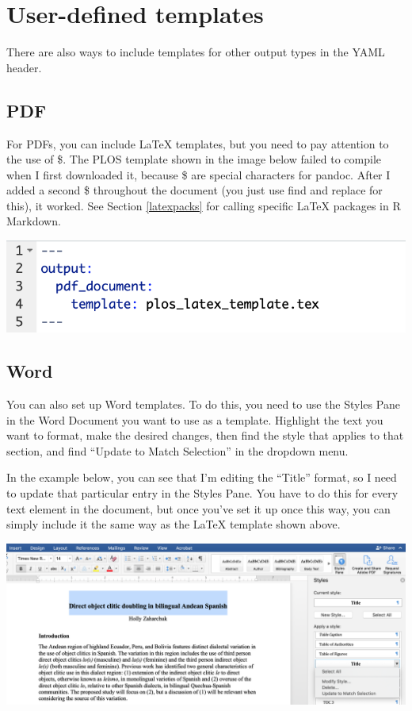 \documentclass[
  openany]{book}
\begin{document}
\hypertarget{usedef}{%
\section{User-defined templates}\label{usedef}}

There are also ways to include templates for other output types in the YAML header.

\hypertarget{pdf}{%
\subsection{PDF}\label{pdf}}

For PDFs, you can include LaTeX templates, but you need to pay attention to the use of \$. The PLOS template shown in the image below failed to compile when I first downloaded it, because \$ are special characters for pandoc. After I added a second \$ throughout the document (you just use find and replace for this), it worked. See Section \ref{latexpacks} for calling specific LaTeX packages in R Markdown.

\includegraphics[width=\textwidth]{images/template_latex}

\hypertarget{word}{%
\subsection{Word}\label{word}}

You can also set up Word templates. To do this, you need to use the Styles Pane in the Word Document you want to use as a template. Highlight the text you want to format, make the desired changes, then find the style that applies to that section, and find ``Update to Match Selection'' in the dropdown menu.

In the example below, you can see that I'm editing the ``Title'' format, so I need to update that particular entry in the Styles Pane. You have to do this for every text element in the document, but once you've set it up once this way, you can simply include it the same way as the LaTeX template shown above.

\includegraphics[width=\textwidth]{images/template_word}
\end{document}
